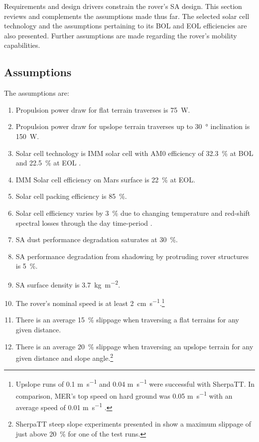 Requirements and design drivers constrain the rover's \ac{SA} design. This section reviews and complements the assumptions made thus far. The selected solar cell technology and the assumptions pertaining to its \ac{BOL} and \ac{EOL} efficiencies are also presented. Further assumptions are made regarding the rover's mobility capabilities.

\subsection{Assumptions}
\label{sec:RequirementsAndDesignDrivers:Assumptions}
The assumptions are:

\resetLeadingZeroCounter
\begin{enumerate}[leftmargin=1.31cm, label=\zeroLeadCounter{A}]
    \item Propulsion power draw for flat terrain traverses is \SI{75}{\watt}.
    \item Propulsion power draw for upslope terrain traverses up to \SI{30}{\degree} inclination is \SI{150}{\watt}.
    \item Solar cell technology is \ac{IMM} solar cell with AM0 efficiency of \SI{32.3}{\percent} at \ac{BOL} and \SI{22.5}{\percent} at \ac{EOL} .
    \item \label{itm:ass:solar_cell_efficiency} \ac{IMM} Solar cell efficiency on Mars surface is \SI{22}{\percent} at \ac{EOL}.
    \item \label{itm:ass:packing_efficiency} Solar cell packing efficiency is \SI{85}{\percent}.
    \item \label{itm:ass:red_shifts} Solar cell efficiency varies by \SI{3}{\percent} due to changing temperature and red-shift spectral losses through the day time-period .
    \item \label{itm:ass:dust_deposition_saturation} \ac{SA} dust performance degradation saturates at \SI{30}{\percent}.
    \item \label{itm:ass:protruding_shadowing} \ac{SA} performance degradation from shadowing by protruding rover structures is \SI{5}{\percent}.
    \item \label{itm:ass:sa_surface_density} \ac{SA} surface density is \SI{3.7}{kg.m^{-2}}.
    \item The rover's nominal speed is at least \SI{2}{cm.s^{-1}}.\footnote{Upslope runs of 0.1 \si{m.s^{-1}} and 0.04 \si{m.s^{-1}} were successful with SherpaTT. In comparison, \ac{MER}'s top speed on hard ground was 0.05 \si{m.s^{-1}} with an average speed of 0.01 \si{m.s^{-1}} .}
    \item There is an average \SI{15}{\percent} slippage when traversing a flat terrains for any given distance.
    \item There is an average \SI{20}{\percent} slippage when traversing an upslope terrain for any given distance and slope angle.\footnote{SherpaTT steep slope experiments presented in  show a maximum slippage of just above \SI{20}{\percent} for one of the test runs.}
\end{enumerate}


